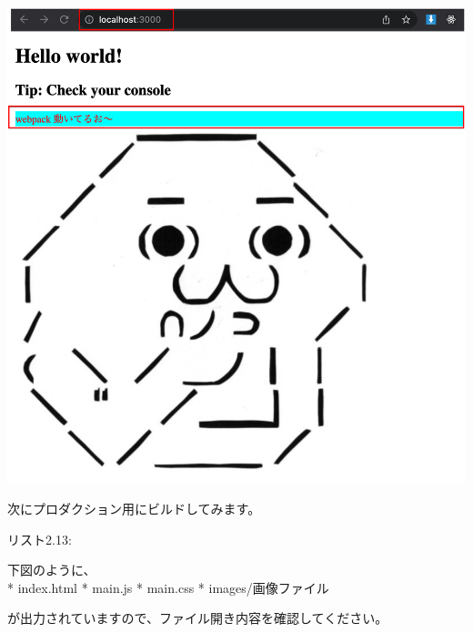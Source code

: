 \begin{reviewimage}%
\includegraphics[width=1.0\maxwidth]{./images/02-create-react-app/webpack_test04.png}%
\label{image:02-create-react-app:webpack_test04}
\end{reviewimage}

次にプロダクション用にビルドしてみます。

\def\startercodeblockfontsize{}
\begin{starterterminal}[ビルド]{リスト2.13: }\end{starterterminal}

下図のように、\\[0pt]
* index.html
* main.js
* main.css
* images/画像ファイル

が出力されていますので、ファイル開き内容を確認してください。

